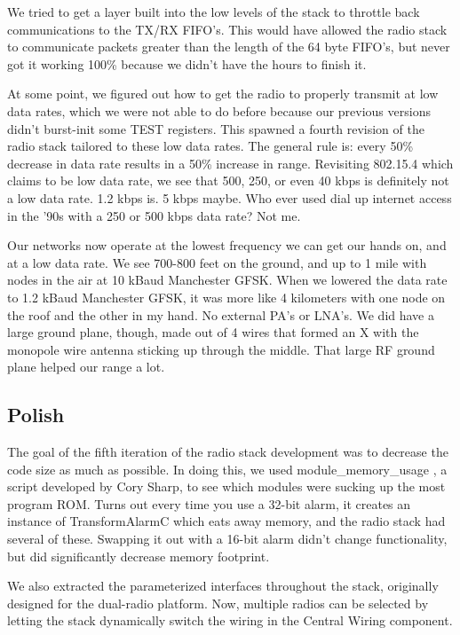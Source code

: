 \documentclass{article}
\begin{document}
We tried to get a layer built into the low levels of the stack to throttle back communications to the TX/RX FIFO's.
This would have allowed the radio stack to communicate packets greater than the length of the 64 byte FIFO's, but
never got it working 100\% because we didn't have the hours to finish it.

At some point, we figured out how to get the radio to properly transmit at low data rates, which we were not 
able to do before because our previous versions didn't burst-init some TEST registers. This 
spawned a fourth revision of the radio stack tailored to these low data rates. The general rule is:
every 50\% decrease in data rate results in a 50\% increase in range. Revisiting 802.15.4 which claims to be low
data rate, we see that 500, 250, or even 40 kbps is definitely not a low data rate. 1.2 kbps is. 5 kbps maybe.
Who ever used dial up internet access in the '90s with a 250 or 500 kbps data rate?  Not me.

Our networks now operate at the lowest frequency we can get our hands on, and at a low data rate. We see
700-800 feet on the ground, and up to 1 mile with nodes in the air at 10 kBaud Manchester GFSK. When we lowered the
data rate to 1.2 kBaud Manchester GFSK, it was more like 4 kilometers with one node on the roof
and the other in my hand.  No external PA's or LNA's. We did have a large
ground plane, though, made out of 4 wires that formed an X with the
monopole wire antenna sticking up through the middle. That large
RF ground plane helped our range a lot.

\subsection{Polish}
The goal of the fifth iteration of the radio stack development was to decrease the code size as much as
possible. In doing this, we used module\_memory\_usage \cite{modulememoryusage}, a script developed by Cory Sharp, to see which
modules were sucking up the most program ROM.  Turns out every time you use a 32-bit alarm, it creates
an instance of TransformAlarmC which eats away memory, and the radio stack had several of these. 
Swapping it out with a 16-bit alarm didn't change functionality, but did significantly decrease memory
footprint. 

We also extracted the parameterized interfaces throughout the stack, originally designed for the dual-radio
platform. Now, multiple radios can be selected by letting the stack dynamically switch the wiring in
the Central Wiring component.
\end{document}
